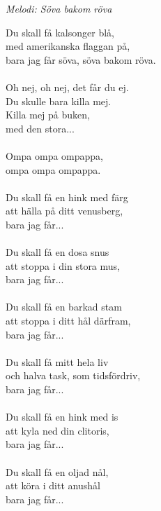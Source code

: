 {\footnotesize\textit{Melodi: Söva bakom röva}}\par
\vspace{10pt}
Du skall få kalsonger blå,\\
med amerikanska flaggan på,\\
bara jag får söva, söva bakom röva. \\
\\
Oh nej, oh nej, det får du ej.\\
Du skulle bara killa mej.\\
Killa mej på buken,\\
med den stora...\\
\\
Ompa ompa ompappa,\\
ompa ompa ompappa.\\
\\
Du skall få en hink med färg\\
att hälla på ditt venusberg,\\
bara jag får...\\
\\
Du skall få en dosa snus\\
att stoppa i din stora mus,\\
bara jag får...\\
\\
Du skall få en barkad stam\\
att stoppa i ditt hål därfram,\\
bara jag får...\\
\\
Du skall få mitt hela liv\\
och halva task, som tidsfördriv,\\
bara jag får...\\
\\
Du skall få en hink med is\\
att kyla ned din clitoris,\\
bara jag får...\\
\\
Du skall få en oljad nål,\\
att köra i ditt anushål\\
bara jag får...
